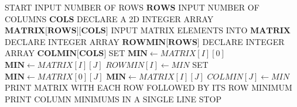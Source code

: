 \begin{algorithm}[H]
\caption{Find Row and Column Minimums in a Matrix}
\begin{algorithmic}[1]
\STATE START
\STATE INPUT NUMBER OF ROWS $\textbf{ROWS}$
\STATE INPUT NUMBER OF COLUMNS $\textbf{COLS}$
\STATE DECLARE A 2D INTEGER ARRAY $\textbf{MATRIX[ROWS][COLS]}$
\STATE INPUT MATRIX ELEMENTS INTO $\textbf{MATRIX}$
\STATE DECLARE INTEGER ARRAY $\textbf{ROWMIN[ROWS]}$
\STATE DECLARE INTEGER ARRAY $\textbf{COLMIN[COLS]}$
    \STATE SET $\textbf{MIN} \gets MATRIX[I][0]$
            \STATE $\textbf{MIN} \gets MATRIX[I][J]$
        \ENDIF
    \ENDFOR
    \STATE $ROWMIN[I] \gets MIN$
\ENDFOR
{}
    \STATE SET $\textbf{MIN} \gets MATRIX[0][J]$
            \STATE $\textbf{MIN} \gets MATRIX[I][J]$
        \ENDIF
    \ENDFOR
    \STATE $COLMIN[J] \gets MIN$
\ENDFOR
\STATE PRINT MATRIX WITH EACH ROW FOLLOWED BY ITS ROW MINIMUM
\STATE PRINT COLUMN MINIMUMS IN A SINGLE LINE
\STATE STOP
\end{algorithmic}
\end{algorithm}
